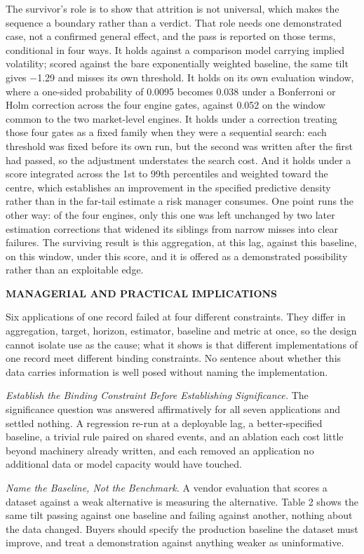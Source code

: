 \documentclass[12pt,a4paper]{article}
\newcommand{\mainhead}[1]{%
  \par\vspace{10pt}\noindent\textbf{\MakeUppercase{#1}}\par\vspace{2pt}}
\begin{document}
The survivor's role is to show that attrition is not universal, which makes the sequence a boundary rather than a verdict. That role needs one demonstrated case, not a confirmed general effect, and the pass is reported on those terms, conditional in four ways. It holds against a comparison model carrying implied volatility; scored against the bare exponentially weighted baseline, the same tilt gives −1.29 and misses its own threshold. It holds on its own evaluation window, where a one-sided probability of 0.0095 becomes 0.038 under a Bonferroni or Holm correction across the four engine gates, against 0.052 on the window common to the two market-level engines. It holds under a correction treating those four gates as a fixed family when they were a sequential search: each threshold was fixed before its own run, but the second was written after the first had passed, so the adjustment understates the search cost. And it holds under a score integrated across the 1st to 99th percentiles and weighted toward the centre, which establishes an improvement in the specified predictive density rather than in the far-tail estimate a risk manager consumes. One point runs the other way: of the four engines, only this one was left unchanged by two later estimation corrections that widened its siblings from narrow misses into clear failures. The surviving result is this aggregation, at this lag, against this baseline, on this window, under this score, and it is offered as a demonstrated possibility rather than an exploitable edge.

\mainhead{MANAGERIAL AND PRACTICAL IMPLICATIONS}

Six applications of one record failed at four different constraints. They differ in aggregation, target, horizon, estimator, baseline and metric at once, so the design cannot isolate use as the cause; what it shows is that different implementations of one record meet different binding constraints. No sentence about whether this data carries information is well posed without naming the implementation.

\textit{Establish the Binding Constraint Before Establishing Significance.} The significance question was answered affirmatively for all seven applications and settled nothing. A regression re-run at a deployable lag, a better-specified baseline, a trivial rule paired on shared events, and an ablation each cost little beyond machinery already written, and each removed an application no additional data or model capacity would have touched.

\textit{Name the Baseline, Not the Benchmark.} A vendor evaluation that scores a dataset against a weak alternative is measuring the alternative. Table 2 shows the same tilt passing against one baseline and failing against another, nothing about the data changed. Buyers should specify the production baseline the dataset must improve, and treat a demonstration against anything weaker as uninformative.
\end{document}
